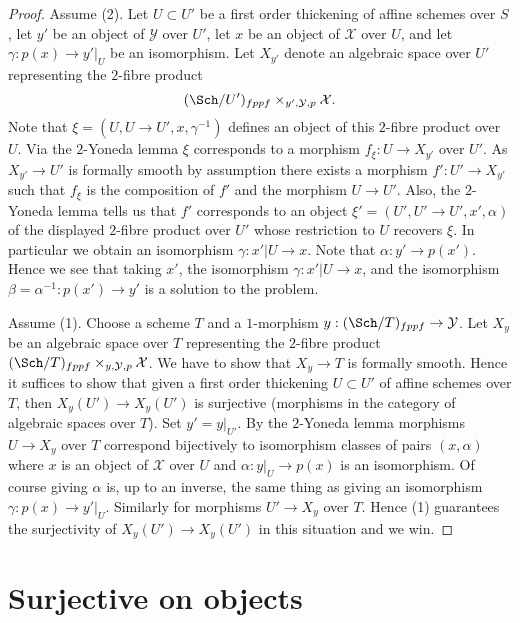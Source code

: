 \begin{proof}
Assume (2). Let $U \subset U'$ be a first order thickening
of affine schemes over $S$, let $y'$ be an object of $\mathcal{Y}$
over $U'$, let $x$ be an object of $\mathcal{X}$ over $U$,
and let $\gamma : p(x) \to y'|_U$ be an isomorphism. Let
$X_{y'}$ denote an algebraic space over $U'$ representing the $2$-fibre
product
$$
(\Sch/U')_{fppf} \times_{y', \mathcal{Y}, p} \mathcal{X}.
$$
Note that $\xi = (U, U \to U', x, \gamma^{-1})$ defines an object of
this $2$-fibre product over $U$. Via the $2$-Yoneda lemma $\xi$ corresponds
to a morphism $f_\xi : U \to X_{y'}$ over $U'$. As $X_{y'} \to U'$ is
formally smooth by assumption there exists a morphism
$f' : U' \to X_{y'}$ such that $f_\xi$ is the composition of $f'$
and the morphism $U \to U'$. Also, the $2$-Yoneda lemma tells us that
$f'$ corresponds to an object $\xi' = (U', U' \to U', x', \alpha)$ of
the displayed $2$-fibre product over $U'$ whose restriction to
$U$ recovers $\xi$. In particular we obtain an isomorphism
$\gamma : x'|U \to x$. Note that $\alpha : y' \to p(x')$.
Hence we see that taking $x'$, the isomorphism
$\gamma : x'|U \to x$, and the isomorphism
$\beta = \alpha^{-1} : p(x') \to y'$
is a solution to the problem.

\medskip\noindent
Assume (1). Choose a scheme $T$ and a $1$-morphism
$y : (\Sch/T)_{fppf} \to \mathcal{Y}$. Let
$X_y$ be an algebraic space over $T$ representing the $2$-fibre product
$(\Sch/T)_{fppf} \times_{y, \mathcal{Y}, p} \mathcal{X}$.
We have to show that $X_y \to T$ is formally smooth.
Hence it suffices to show that given a first order thickening
$U \subset U'$ of affine schemes over $T$, then
$X_y(U') \to X_y(U')$ is surjective (morphisms in the
category of algebraic spaces over $T$). Set $y' = y|_{U'}$.
By the $2$-Yoneda lemma morphisms $U \to X_y$ over $T$ correspond bijectively
to isomorphism classes of pairs $(x, \alpha)$ where $x$ is an object
of $\mathcal{X}$ over $U$ and $\alpha : y|_U \to p(x)$ is an isomorphism.
Of course giving $\alpha$ is, up to an inverse, the same thing as giving
an isomorphism $\gamma : p(x) \to y'|_U$.
Similarly for morphisms $U' \to X_y$ over $T$. Hence (1) guarantees
the surjectivity of $X_y(U') \to X_y(U')$
in this situation and we win.
\end{proof}







\section{Surjective on objects}
\label{section-formally-surjective}

